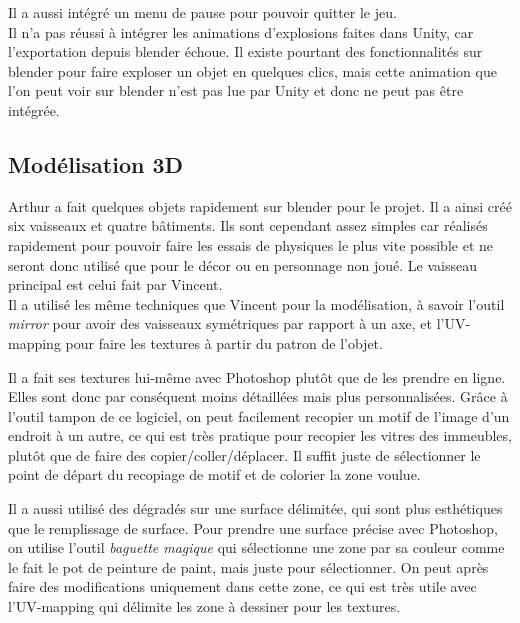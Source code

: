 \documentclass[10pt, titlepage]{report}
\begin{document}
Il a aussi intégré un menu de pause pour pouvoir quitter le jeu.\\

Il n'a pas réussi à intégrer les animations d'explosions faites dans Unity, car l'exportation depuis blender échoue. Il existe pourtant des fonctionnalités sur blender pour faire exploser un objet en quelques clics, mais cette animation que l'on peut voir sur blender n'est pas lue par Unity et donc ne peut pas être intégrée.

\subsection{Modélisation 3D}

Arthur a fait quelques objets rapidement sur blender pour le projet. Il a ainsi créé six vaisseaux et quatre bâtiments. Ils sont cependant assez simples car réalisés rapidement pour pouvoir faire les essais de physiques le plus vite possible et ne seront donc utilisé que pour le décor ou en personnage non joué. Le vaisseau principal est celui fait par Vincent.\\

Il a utilisé les même techniques que Vincent pour la modélisation, à savoir l'outil \textit{mirror} pour avoir des vaisseaux symétriques par rapport à un axe, et  l'UV-mapping pour faire les textures à partir du patron de l'objet.

Il a fait ses textures lui-même avec Photoshop plutôt que de les prendre en ligne. Elles sont donc par conséquent moins détaillées mais plus personnalisées. Grâce à l'outil tampon de ce logiciel, on peut facilement recopier un motif de l'image d'un endroit à un autre, ce qui est très pratique pour recopier les vitres des immeubles, plutôt que de faire des copier/coller/déplacer. Il suffit juste de sélectionner le point de départ du recopiage de motif et de colorier la zone voulue.

 Il a aussi utilisé des dégradés sur une surface délimitée, qui sont plus esthétiques que le remplissage de surface. Pour prendre une surface précise avec Photoshop, on utilise l'outil \textit{baguette magique} qui sélectionne une zone par sa couleur comme le fait le pot de peinture de paint, mais juste pour sélectionner. On peut après faire des modifications uniquement dans cette zone, ce qui est très utile avec l'UV-mapping qui délimite les zone à dessiner pour les textures.\\
\end{document}
